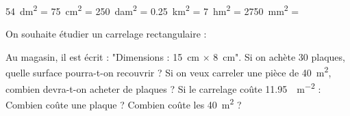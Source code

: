 \documentclass[../Cours.tex]{subfiles}
\begin{document}
\begin{questions}
\begin{center}
        \end{center}
        
    \exercice 
        \question \qty{54}{dm\squared} = 
        \question \qty{75}{cm\squared} = 
        \question \qty{250}{dam\squared} = 
        \question \qty{0,25}{km\squared} = 
        \question \qty{7}{hm\squared} = 
        \question \qty{2750}{mm\squared} = 

    \clearpage
    \exercice On souhaite étudier un carrelage rectangulaire :
    \begin{center}
    \end{center}

    Au magasin, il est écrit : "Dimensions : \qty{15}{\centi\metre} $\times$ \qty{8}{\centi\metre}".
    \question Si on achète 30 plaques, quelle surface pourra-t-on recouvrir ?
    \question Si on veux carreler une pièce de \qty{40}{\metre\squared}, combien devra-t-on acheter de plaques ?
    \question Si le carrelage coûte \qty{11.95}{\EURO\per\metre\squared} :
        \subquestion Combien coûte une plaque ?
        \subquestion Combien coûte les \qty{40}{\metre\squared} ?
\end{questions}
\end{document}
